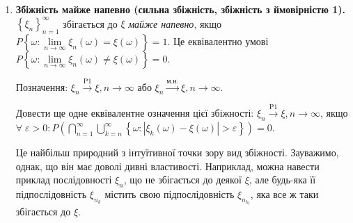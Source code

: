 \noindent\begin{enumerate}
    \item \textbf{Збіжність майже напевно (сильна збіжність, збіжність з ймовірністю 1).}
    \noindent$\left\{ \xi_n\right\}_{n=1}^{\infty}$ збігається до $\xi$ \emph{майже напевно}, якщо
    $P\left\{ \omega: \underset{n\to\infty}{\lim} \xi_n(\omega) = \xi(\omega)\right\} = 1$. 
    Це еквівалентно умові $P\left\{ \omega: \underset{n\to\infty}{\lim} \xi_n(\omega) \neq \xi(\omega)\right\} = 0$.

    Позначення: $\xi_n \overset{\mathrm{P1}}{\longrightarrow} \xi, n \to \infty$ або $\xi_n \overset{\text{м.н.}}{\longrightarrow} \xi, n \to \infty$.
    \begin{exercise}
        Довести ще одне еквівалентне означення цієї збіжності: $\xi_n \overset{\mathrm{P1}}{\longrightarrow} \xi, n \to \infty$, якщо
        $\forall \; \varepsilon > 0: P\left( \bigcap\limits_{n=1}^{\infty} \bigcup\limits_{k = n}^{\infty}
        \left\{ \omega : \left| \xi_k(\omega) - \xi(\omega)\right| > \varepsilon\right\}\right) = 0$.
    \end{exercise}

    Це найбільш природний з інтуїтивної точки зору вид збіжності. Зауважимо, однак, що він має доволі дивні властивості. Наприклад, можна навести приклад
    послідовності $\xi_n$, що не збігається до деякої $\xi$, але будь-яка її підпослідовність $\xi_{n_k}$ містить свою підпослідовність
    $\xi_{n_{k_l}}$, яка все ж таки збігається до $\xi$.
    

\end{enumerate}
